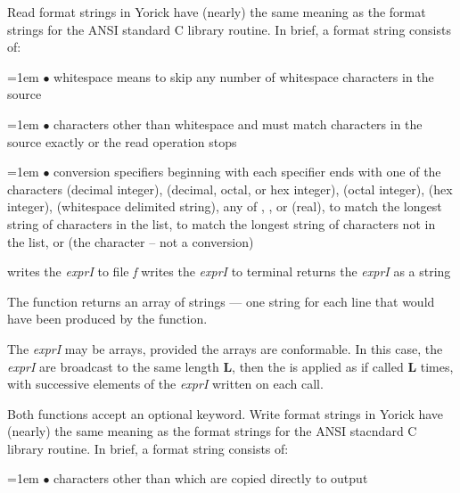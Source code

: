 Read format strings in Yorick have (nearly) the same meaning as the
format strings for the ANSI standard C library  routine.  In
brief, a format string consists of:

\hangindent=1em
$\bullet$ whitespace \hfil\break
means to skip any number of whitespace characters in the source

\hangindent=1em
$\bullet$ characters other than whitespace and \kbd{\%} \hfil\break
must match characters in the source exactly or the read operation stops

\hangindent=1em
$\bullet$ conversion specifiers beginning with \kbd{\%} \hfil\break
each specifier ends with one of the characters  (decimal integer),
 (decimal, octal, or hex integer),  (octal integer),
 (hex integer),  (whitespace delimited string),
any of , , or  (real),
\kbd{[{\it xxx}]} to match the longest string of characters in the list,
\kbd{[\^{}{\it xxx}]} to match the longest string of characters not in
the list, or \kbd{\%} (the \kbd{\%} character -- not a conversion)

\shortcopyrightnotice


     {writes the {\it exprI\/} to file {\it f}}
     {writes the {\it exprI\/} to terminal}
     {returns the {\it exprI\/} as a string}

The  function returns an array of strings --- one string
for each line that would have been produced by the  function.

The {\it exprI\/} may be arrays, provided the arrays are conformable.
In this case, the {\it exprI\/} are broadcast to the same length {\bf L},
then the  is applied as if called {\bf L} times, with
successive elements of the {\it exprI\/} written on each call.

Both functions accept an optional  keyword.  Write format
strings in Yorick have (nearly) the same meaning as the format strings
for the ANSI stacndard C library  routine.  In brief, a format
string consists of:

\hangindent=1em
$\bullet$ characters other than \kbd{\%} \hfil\break
which are copied directly to output

